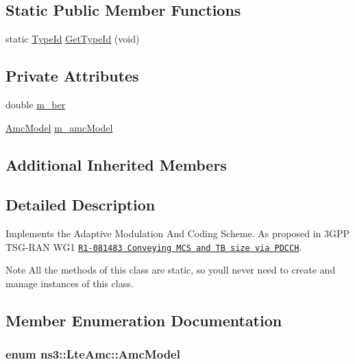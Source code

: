 \subsection*{Static Public Member Functions}
\begin{DoxyCompactItemize}
\item 
static \hyperlink{classns3_1_1TypeId}{Type\+Id} \hyperlink{classns3_1_1LteAmc_af33cfa7961d2b12f766011266f5454bc}{Get\+Type\+Id} (void)
\end{DoxyCompactItemize}
\subsection*{Private Attributes}
\begin{DoxyCompactItemize}
\item 
double \hyperlink{classns3_1_1LteAmc_a85e7b0e6cd9ce70ef91a796033540362}{m\+\_\+ber}
\item 
\hyperlink{classns3_1_1LteAmc_a2b3b1ed166e80211de82407dea40c157}{Amc\+Model} \hyperlink{classns3_1_1LteAmc_aadde02b027dcbeb1274befeccbdbc1da}{m\+\_\+amc\+Model}
\end{DoxyCompactItemize}
\subsection*{Additional Inherited Members}


\subsection{Detailed Description}
Implements the Adaptive Modulation And Coding Scheme. As proposed in 3\+G\+PP T\+S\+G-\/\+R\+AN W\+G1 \href{http://www.3gpp.org/ftp/tsg_ran/WG1_RL1/TSGR1_52b/Docs/R1-081483.zip}{\tt R1-\/081483 Conveying M\+CS and TB size via P\+D\+C\+CH}.

\begin{DoxyNote}{Note}
All the methods of this class are static, so you\textquotesingle{}ll never need to create and manage instances of this class. 
\end{DoxyNote}


\subsection{Member Enumeration Documentation}
\subsubsection[{\texorpdfstring{Amc\+Model}{AmcModel}}]{\setlength{\rightskip}{0pt plus 5cm}enum {\bf ns3\+::\+Lte\+Amc\+::\+Amc\+Model}}\hypertarget{classns3_1_1LteAmc_a2b3b1ed166e80211de82407dea40c157}{}\label{classns3_1_1LteAmc_a2b3b1ed166e80211de82407dea40c157}


